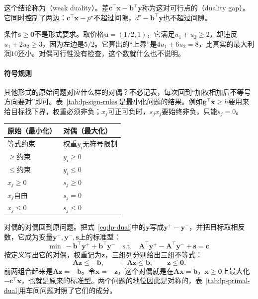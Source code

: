 这个结论称为（weak duality）。差$\bm{c}^\top\bm{x}-\bm{b}^\top\bm{y}$称为这对可行点的（duality gap）。它同时控制了两边：$\bm{c}^\top\bm{x}-p^\star$不超过间隙，$d^\star-\bm{b}^\top\bm{y}$也不超过间隙。

条件$\bm{s}\geq\bm{0}$不是形式要求。取价格$\bm{u}=(1/2,1)$，它满足$u_1+u_2\geq2$，却违反$u_1+2u_2\geq3$，因为左边是$5/2$。它算出的“上界”是$4u_1+6u_2=8$，比真实的最大利润$10$还小。对偶可行性没有检查，这个数就什么也不说明。

\paragraph{符号规则}
其他形式的原始问题对应什么样的对偶？不必记表，每次回到“加权相加后不等号方向要对”即可。表~\ref{tab:lp-sign-rules}是最小化问题的结果。例如$\bm{g}^\top\bm{x}\geq h$要用来给目标找下界，权重必须非负；$x_j$可正可负时，$s_jx_j$要始终非负，只能$s_j=0$。

\begin{BookInlineTable}
 \centering
 \begin{tabular}{ll}
  \toprule
  原始（最小化） & 对偶（最大化） \\
  \midrule
  等式约束 & 权重$y_i$无符号限制 \\
  $\geq$约束 & $y_i\geq0$ \\
  $\leq$约束 & $y_i\leq0$ \\
  $x_j\geq0$ & $s_j\geq0$ \\
  $x_j$自由 & $s_j=0$ \\
  $x_j\leq0$ & $s_j\leq0$ \\
  \bottomrule
 \end{tabular}
 \caption{最小化问题的对偶符号规则，其中$s_j=c_j-\bm{a}_j^\top\bm{y}$。}
 \label{tab:lp-sign-rules}
\end{BookInlineTable}

对偶的对偶回到原问题。把式~\eqref{eq:lp-dual}中的$\bm{y}$写成$\bm{y}^{+}-\bm{y}^{-}$，并把目标取相反数，它成为变量$\bm{y}^{+},\bm{y}^{-},\bm{s}$上的标准型：
\[
 \min\ -\bm{b}^\top\bm{y}^{+}+\bm{b}^\top\bm{y}^{-}
 \quad\text{s.t.}\quad
 \bm{A}^\top\bm{y}^{+}-\bm{A}^\top\bm{y}^{-}+\bm{s}=\bm{c}.
\]
按定义写出它的对偶，权重记为$\bm{z}$，三组列分别给出三组不等式：
\[
 \bm{A}\bm{z}\leq-\bm{b},\qquad-\bm{A}\bm{z}\leq\bm{b},\qquad\bm{z}\leq\bm{0}.
\]
前两组合起来是$\bm{A}\bm{z}=-\bm{b}$。令$\bm{x}=-\bm{z}$，这个对偶就是在$\bm{A}\bm{x}=\bm{b}$，$\bm{x}\geq\bm{0}$上最大化$-\bm{c}^\top\bm{x}$，也就是原来的标准型。两个问题的地位因此是对称的，表~\ref{tab:lp-primal-dual}用车间问题对照了它们的成分。

